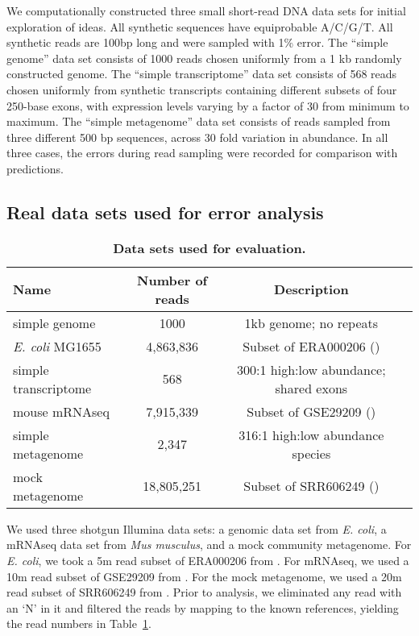 We computationally constructed three small short-read DNA data sets for initial
exploration of ideas.  All synthetic sequences have equiprobable A/C/G/T.  All
synthetic reads are 100bp long and were sampled with 1\% error.  The ``simple
genome'' data set consists of 1000 reads chosen uniformly from a 1 kb randomly
constructed genome. The ``simple transcriptome'' data set consists of 568 reads
chosen uniformly from synthetic transcripts containing different subsets of
four 250-base exons, with expression levels varying by a factor of 30 from
minimum to maximum.  The ``simple metagenome'' data set consists of reads
sampled from three different 500 bp sequences, across 30 fold variation in
abundance.  In all three cases, the errors during read sampling were recorded
for comparison with predictions.

\subsection{Real data sets used for error analysis}


\begin{table}
\small
\centering
\begin{tabular}{|l|c|c|l|}
\hline
Name & Number of reads & Description \\
\hline
simple genome & 1000 & 1kb genome; no repeats \\
{\em E. coli} MG1655 & 4,863,836 & Subset of ERA000206 (\cite{chitsaz}) \\
simple transcriptome & 568 & 300:1 high:low abundance; shared exons \\
mouse mRNAseq & 7,915,339 & Subset of GSE29209 (\cite{trinityrna}) \\
simple metagenome & 2,347 & 316:1 high:low abundance species \\
mock metagenome & 18,805,251 & Subset of SRR606249 (\cite{podar}) \\
\hline
\end{tabular}

\caption{{\bf Data sets used for evaluation.}}

\label{tab:data}
\end{table}



We used three shotgun Illumina data sets: a genomic data set from {\em E.
coli}, a mRNAseq data set from {\em Mus musculus}, and a mock community
metagenome.  For {\em E. coli}, we took a 5m read subset of ERA000206 from
\cite{chitsaz}.  For mRNAseq, we used a 10m read subset of GSE29209 from
\cite{trinityrna}.  For the mock metagenome, we used a 20m read subset of
SRR606249 from \cite{podar}.  Prior to analysis, we eliminated any read with an
`N' in it and filtered the reads by mapping to the known references, yielding
the read numbers in Table~\ref{tab:data}.

